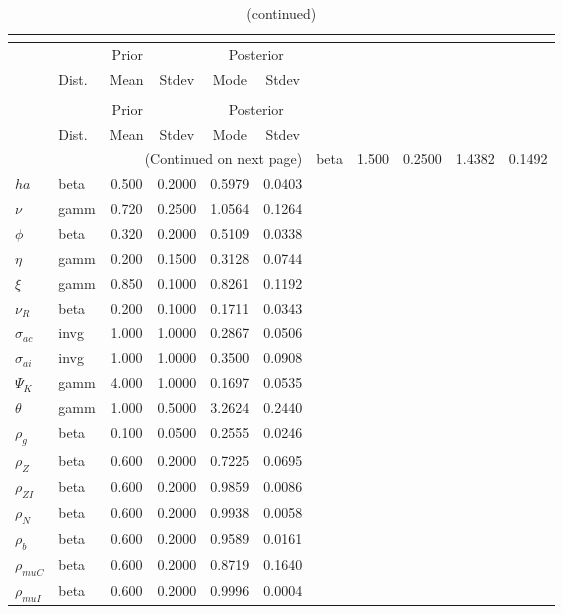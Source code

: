  
\begin{center}
\begin{longtable}{llcccc} 
\caption{Results from posterior maximization (parameters)}\\
 \label{Table:Posterior:1}\\
\toprule 
  & \multicolumn{3}{c}{Prior}  &  \multicolumn{2}{c}{Posterior} \\
  \cmidrule(r{.75em}){2-4} \cmidrule(r{.75em}){5-6}
  & Dist. & Mean  & Stdev & Mode & Stdev \\ 
\midrule \endfirsthead 
\caption{(continued)}\\
 \bottomrule 
  & \multicolumn{3}{c}{Prior}  &  \multicolumn{2}{c}{Posterior} \\
  \cmidrule(r{.75em}){2-4} \cmidrule(r{.75em}){5-6}
  & Dist. & Mean  & Stdev & Mode & Stdev \\ 
\midrule \endhead 
\bottomrule \multicolumn{6}{r}{(Continued on next page)}\endfoot 
\bottomrule\endlastfoot 
${\sigma}$ & beta &   1.500 & 0.2500 &   1.4382 &  0.1492 \\ 
${ha}$ & beta &   0.500 & 0.2000 &   0.5979 &  0.0403 \\ 
$\nu$ & gamm &   0.720 & 0.2500 &   1.0564 &  0.1264 \\ 
${\phi}$ & beta &   0.320 & 0.2000 &   0.5109 &  0.0338 \\ 
${\eta}$ & gamm &   0.200 & 0.1500 &   0.3128 &  0.0744 \\ 
$\xi$ & gamm &   0.850 & 0.1000 &   0.8261 &  0.1192 \\ 
${\nu_R}$ & beta &   0.200 & 0.1000 &   0.1711 &  0.0343 \\ 
${\sigma_{ac}}$ & invg &   1.000 & 1.0000 &   0.2867 &  0.0506 \\ 
${\sigma_{ai}}$ & invg &   1.000 & 1.0000 &   0.3500 &  0.0908 \\ 
${\Psi_{K}}$ & gamm &   4.000 & 1.0000 &   0.1697 &  0.0535 \\ 
${\theta}$ & gamm &   1.000 & 0.5000 &   3.2624 &  0.2440 \\ 
${\rho_g}$ & beta &   0.100 & 0.0500 &   0.2555 &  0.0246 \\ 
${\rho_Z}$ & beta &   0.600 & 0.2000 &   0.7225 &  0.0695 \\ 
${\rho_{ZI}}$ & beta &   0.600 & 0.2000 &   0.9859 &  0.0086 \\ 
${\rho_N}$ & beta &   0.600 & 0.2000 &   0.9938 &  0.0058 \\ 
${\rho_b}$ & beta &   0.600 & 0.2000 &   0.9589 &  0.0161 \\ 
${\rho_{muC}}$ & beta &   0.600 & 0.2000 &   0.8719 &  0.1640 \\ 
${\rho_{muI}}$ & beta &   0.600 & 0.2000 &   0.9996 &  0.0004 \\ 
\end{longtable}
 \end{center}
